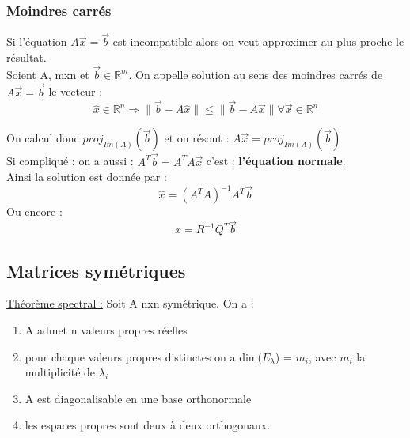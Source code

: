 \documentclass[../main.tex]{subfiles}
\begin{document}
\subsubsection{Moindres carrés}
Si l'équation $A\vec{x} = \vec{b}$ est incompatible alors on veut approximer au plus proche le résultat. \\
Soient A, mxn et $\vec{b}\in \mathbb{R}^m$. On appelle solution au sens des moindres carrés de $A\vec{x} = \vec{b}$ le vecteur : \\
\begin{equation}
    \hat{x}\in \mathbb{R}^n \Rightarrow \rVert \vec{b} - A\hat{x} \rVert \leq \rVert \vec{b} - A\vec{x} \rVert \forall \vec{x} \in \mathbb{R}^n
\end{equation}

On calcul donc $proj_{Im(A)}(\vec{b})$ et on résout : $A\vec{x} = proj_{Im(A)}(\vec{b})$\\
Si compliqué : on a aussi : $A^T\vec{b} = A^TA\vec{x}$ c'est : \textbf{l'équation normale}.\\
Ainsi la solution est donnée par :\\
\begin{equation}
    \hat{x} = (A^TA)^{-1}A^T\vec{b}
\end{equation}
Ou encore :\\
\begin{equation}
    \hat{x} = R^{-1}Q^T\vec{b}
\end{equation}

\subsection{Matrices symétriques}
\quad \underline{Théorème spectral :} Soit A nxn symétrique. On a :\\
\begin{enumerate}
    \item A admet n valeurs propres réelles\\
    \item pour chaque valeurs propres distinctes on a dim($E_{\lambda}$) = $m_i$, avec $m_i$ la multiplicité de $\lambda_i$\\
    \item A est diagonalisable en une base orthonormale\\
    \item les espaces propres sont deux à deux orthogonaux.\\
\end{enumerate}
\end{document}
